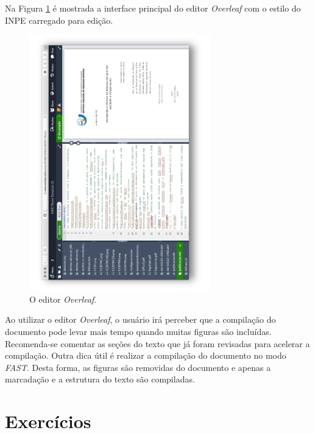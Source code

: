 Na Figura \ref{fig:overleaf2} é mostrada a interface principal do editor \textit{Overleaf} com o estilo do INPE carregado para edição.

\begin{figure}[H]
\caption{O editor \textit{Overleaf}.}
\vspace{6mm}
  \begin{center}
    \includegraphics[width=0.7\textwidth,angle=-90]{./docs/figs/overleaf2.pdf}
  \end{center}
\vspace{4mm}
\label{fig:overleaf2}
\end{figure}

\begin{marker}
Ao utilizar o editor \textit{Overleaf}, o usuário irá perceber que a compilação do documento pode levar mais tempo quando muitas figuras são incluídas. Recomenda-se comentar as seções do texto que já foram revisadas para acelerar a compilação. Outra dica útil é realizar a compilação do documento no modo \textit{FAST}. Desta forma, as figuras são removidas do documento e apenas a marcadação e a estrutura do texto são compiladas.
\end{marker}

\section{Exercícios}
\label{sec:exercicios}

